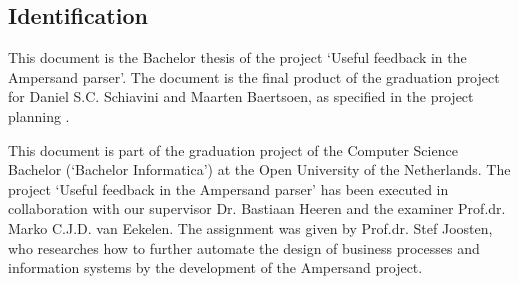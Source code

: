 
\subsection{Identification}
This document is the Bachelor thesis of the project `Useful feedback in the Ampersand parser'.
The document is the final product of the graduation project for Daniel S.C. Schiavini and Maarten Baertsoen, as specified in the project planning .

This document is part of the graduation project of the Computer Science Bachelor (`Bachelor Informatica') at the Open University of the Netherlands.
The project `Useful feedback in the Ampersand parser' has been executed in collaboration with our supervisor Dr. Bastiaan Heeren and the examiner Prof.dr. Marko C.J.D. van Eekelen.
The assignment was given by Prof.dr. Stef Joosten, who researches how to further automate the design of business processes and information systems by the development of the Ampersand project.
